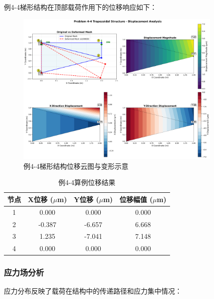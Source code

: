 \documentclass[12pt,a4paper]{article}
\begin{document}
例4-4梯形结构在顶部载荷作用下的位移响应如下：

\begin{figure}[H]
\centering
\includegraphics[width=0.9\textwidth]{img/wzy_displacement_analysis.png}
\caption{例4-4梯形结构位移云图与变形示意}
\label{fig:wzy_displacement}
\end{figure}

\begin{table}[H]
\centering
\caption{例4-4算例位移结果}
\begin{tabular}{cccc}
\toprule
节点 & X位移 ($\mu$m) & Y位移 ($\mu$m) & 位移幅值 ($\mu$m) \\
\midrule
1 & 0.000 & 0.000 & 0.000 \\
2 & -0.387 & -6.657 & 6.668 \\
3 & 1.235 & -7.041 & 7.148 \\
4 & 0.000 & 0.000 & 0.000 \\
\bottomrule
\end{tabular}
\end{table}

\subsubsection{应力场分析}

应力分布反映了载荷在结构中的传递路径和应力集中情况：
\end{document}
